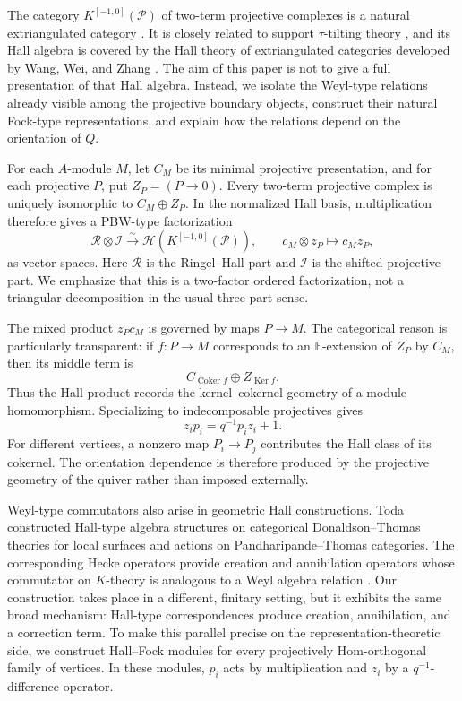 \documentclass[12pt]{article}
\newcommand{\cI}{\mathcal I}
\newcommand{\cP}{\mathscr P}
\newcommand{\cR}{\mathcal R}
\newcommand{\HH}{\mathscr H}
\newcommand{\Ker}{\operatorname{Ker}}
\newcommand{\Coker}{\operatorname{Coker}}
\newcommand{\Ktwo}{K^{[-1,0]}}
\theoremstyle{plain}
\theoremstyle{remark}
\begin{document}
The category $\Ktwo(\cP)$ of two-term projective complexes is a natural
extriangulated category \cite{NP19,Gar24}. It is closely related to support
$\tau$-tilting theory \cite{AIR14}, and its Hall algebra is covered by the
Hall theory of extriangulated categories developed by Wang, Wei, and Zhang
\cite{WWZ22}. The aim of this paper is not to give a full presentation of
that Hall algebra. Instead, we isolate the Weyl-type relations already
visible among the projective boundary objects, construct their natural
Fock-type representations, and explain how the relations depend on the
orientation of $Q$.

For each $A$-module $M$, let $C_M$ be its minimal projective presentation,
and for each projective $P$, put $Z_P=(P\to0)$. Every two-term projective
complex is uniquely isomorphic to $C_M\oplus Z_P$. In the normalized Hall
basis, multiplication therefore gives a PBW-type factorization
\[
 \cR\otimes\cI\xrightarrow{\sim}\HH(\Ktwo(\cP)),
 \qquad c_M\otimes z_P\longmapsto c_Mz_P,
\]
as vector spaces. Here $\cR$ is the Ringel--Hall part and $\cI$ is the
shifted-projective part. We emphasize that this is a two-factor ordered
factorization, not a triangular decomposition in the usual three-part
sense.

The mixed product $z_Pc_M$ is governed by maps $P\to M$. The categorical
reason is particularly transparent: if $f:P\to M$ corresponds to an
$\mathbb E$-extension of $Z_P$ by $C_M$, then its middle term is
\[
 C_{\Coker f}\oplus Z_{\Ker f}.
\]
Thus the Hall product records the kernel--cokernel geometry of a module
homomorphism. Specializing to indecomposable projectives gives
\[
 z_ip_i=q^{-1}p_iz_i+1.
\]
For different vertices, a nonzero map $P_i\to P_j$ contributes the Hall
class of its cokernel. The orientation dependence is therefore produced by
the projective geometry of the quiver rather than imposed externally.

Weyl-type commutators also arise in geometric Hall constructions. Toda
constructed Hall-type algebra structures on categorical Donaldson--Thomas
theories for local surfaces and actions on Pandharipande--Thomas categories.
The corresponding Hecke operators provide creation and annihilation
operators whose commutator on $K$-theory is analogous to a Weyl algebra
relation \cite{Toda20}. Our construction takes place in a different,
finitary setting, but it exhibits the same broad mechanism: Hall-type
correspondences produce creation, annihilation, and a correction term. To
make this parallel precise on the representation-theoretic side, we
construct Hall--Fock modules for every projectively Hom-orthogonal family of
vertices. In these modules, $p_i$ acts by multiplication and $z_i$ by a
$q^{-1}$-difference operator.
\end{document}
